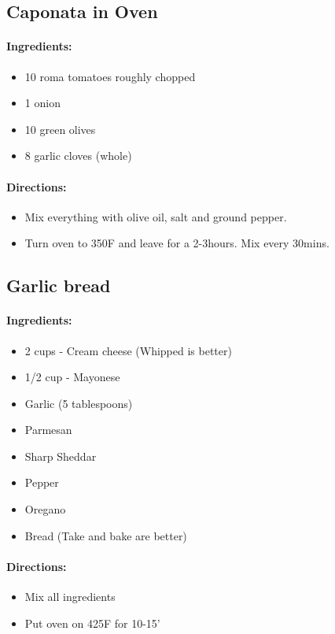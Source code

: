 \documentclass{article}
\begin{document}
\subsection{Caponata in Oven}
\paragraph{Ingredients:}

\begin{itemize}
	\item 10 roma tomatoes roughly chopped
	\item 1 onion
	\item 10 green olives
	\item 8 garlic cloves (whole)
\end{itemize}

\paragraph{Directions:}
\begin{itemize}
	\item Mix everything with olive oil, salt and ground pepper.
	\item Turn oven to 350F and leave for a 2-3hours. Mix every 30mins.
\end{itemize}

\subsection{Garlic bread}

\paragraph{Ingredients:}

\begin{itemize}
	\item 2 cups - Cream cheese (Whipped is better)
	\item 1/2 cup - Mayonese 
	\item Garlic (5 tablespoons)
	\item Parmesan
	\item Sharp Sheddar
	\item Pepper
	\item Oregano
	\item Bread (Take and bake are better)
\end{itemize}

\paragraph{Directions:}
\begin{itemize}
	\item Mix all ingredients
	\item Put oven on 425F for 10-15'
\end{itemize}
\end{document}
